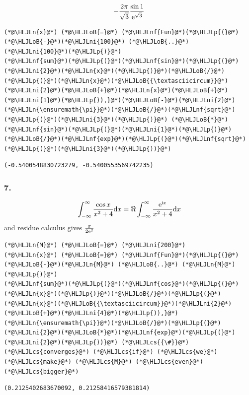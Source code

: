 \documentclass[12pt,a4paper]{article}
\newcommand{\HLJLn}[1]{#1}
\newcommand{\HLJLnf}[1]{\textcolor[RGB]{66,102,213}{#1}}
\newcommand{\HLJLni}[1]{\textcolor[RGB]{59,151,46}{#1}}
\newcommand{\HLJLoB}[1]{\textcolor[RGB]{102,102,102}{\textbf{#1}}}
\newcommand{\HLJLp}[1]{#1}
\newcommand{\HLJLcs}[1]{\textcolor[RGB]{153,153,119}{\textit{#1}}}
\def\D{ {\rm d} }
\def\I{ {\rm i} }
\def\E{ {\rm e} }
\def\dx{\D x}
\begin{document}
\[
   -{2 \pi \over \sqrt 3} {\sin 1 \over \E^{\sqrt{3}}}
\]

\begin{lstlisting}
(*@\HLJLn{x}@*) (*@\HLJLoB{=}@*) (*@\HLJLnf{Fun}@*)(*@\HLJLp{(}@*)(*@\HLJLoB{-}@*)(*@\HLJLni{100}@*) (*@\HLJLoB{..}@*) (*@\HLJLni{100}@*)(*@\HLJLp{)}@*)
(*@\HLJLnf{sum}@*)(*@\HLJLp{(}@*)(*@\HLJLnf{sin}@*)(*@\HLJLp{(}@*)(*@\HLJLni{2}@*)(*@\HLJLn{x}@*)(*@\HLJLp{)}@*)(*@\HLJLoB{/}@*)(*@\HLJLp{(}@*)(*@\HLJLn{x}@*)(*@\HLJLoB{{\textasciicircum}}@*)(*@\HLJLni{2}@*)(*@\HLJLoB{+}@*)(*@\HLJLn{x}@*)(*@\HLJLoB{+}@*)(*@\HLJLni{1}@*)(*@\HLJLp{)),}@*)(*@\HLJLoB{-}@*)(*@\HLJLni{2}@*)(*@\HLJLn{\ensuremath{\pi}}@*)(*@\HLJLoB{/}@*)(*@\HLJLnf{sqrt}@*)(*@\HLJLp{(}@*)(*@\HLJLni{3}@*)(*@\HLJLp{)}@*) (*@\HLJLoB{*}@*) (*@\HLJLnf{sin}@*)(*@\HLJLp{(}@*)(*@\HLJLni{1}@*)(*@\HLJLp{)}@*)(*@\HLJLoB{/}@*)(*@\HLJLnf{exp}@*)(*@\HLJLp{(}@*)(*@\HLJLnf{sqrt}@*)(*@\HLJLp{(}@*)(*@\HLJLni{3}@*)(*@\HLJLp{))}@*)
\end{lstlisting}

\begin{lstlisting}
(-0.5400548830723279, -0.5400553569742235)
\end{lstlisting}


\subsubsection{7.}
\[
	\int_{-\infty}^\infty    {\cos x \over x^2 + 4} \dx = \Re 	\int_{-\infty}^\infty    {\E^{\I x}\over x^2 + 4} \dx
\]
and residue calculus gives ${\pi \over 2 \E^2}$


\begin{lstlisting}
(*@\HLJLn{M}@*) (*@\HLJLoB{=}@*) (*@\HLJLni{200}@*)
(*@\HLJLn{x}@*) (*@\HLJLoB{=}@*) (*@\HLJLnf{Fun}@*)(*@\HLJLp{(}@*)(*@\HLJLoB{-}@*)(*@\HLJLn{M}@*) (*@\HLJLoB{..}@*) (*@\HLJLn{M}@*)(*@\HLJLp{)}@*)
(*@\HLJLnf{sum}@*)(*@\HLJLp{(}@*)(*@\HLJLnf{cos}@*)(*@\HLJLp{(}@*)(*@\HLJLn{x}@*)(*@\HLJLp{)}@*)(*@\HLJLoB{/}@*)(*@\HLJLp{(}@*)(*@\HLJLn{x}@*)(*@\HLJLoB{{\textasciicircum}}@*)(*@\HLJLni{2}@*)(*@\HLJLoB{+}@*)(*@\HLJLni{4}@*)(*@\HLJLp{)),}@*)(*@\HLJLn{\ensuremath{\pi}}@*)(*@\HLJLoB{/}@*)(*@\HLJLp{(}@*)(*@\HLJLni{2}@*)(*@\HLJLoB{*}@*)(*@\HLJLnf{exp}@*)(*@\HLJLp{(}@*)(*@\HLJLni{2}@*)(*@\HLJLp{))}@*) (*@\HLJLcs{{\#}}@*) (*@\HLJLcs{converges}@*) (*@\HLJLcs{if}@*) (*@\HLJLcs{we}@*) (*@\HLJLcs{make}@*) (*@\HLJLcs{M}@*) (*@\HLJLcs{even}@*) (*@\HLJLcs{bigger}@*)
\end{lstlisting}

\begin{lstlisting}
(0.2125402683670092, 0.21258416579381814)
\end{lstlisting}
\end{document}
